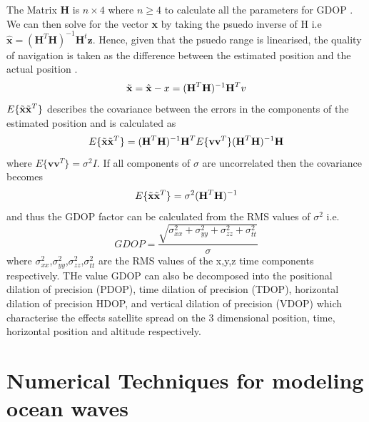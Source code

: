 The Matrix \textbf{H} is $n\times4$ where $n \geq 4$ to calculate all the parameters for GDOP \cite{jwo2001efficient}. We can then solve for the vector \textbf{x} by taking the psuedo inverse of H i.e $\hat{\textbf{x}} = (\textbf{H}^T\textbf{H})^{-1}\textbf{H}^t\textbf{z}$. Hence, given that the psuedo range is linearised, the quality of navigation is taken as the difference between the estimated position and the actual position \cite{jwo2001efficient}.
\begin{equation}
	\Tilde{\textbf{x}} = \hat{\textbf{x}} - x = (\textbf{H}^T\textbf{H})^{-1}\textbf{H}^Tv
\end{equation}
$E\{\Tilde{\textbf{x}}\Tilde{\textbf{x}}^T\}$ describes the covariance between the errors in the components of the estimated position \cite{jwo2001efficient} and is calculated as 
\begin{equation}
	E\{\Tilde{\textbf{x}}\Tilde{\textbf{x}}^T\} = (\textbf{H}^T\textbf{H})^{-1}\textbf{H}^TE\{\textbf{vv}^T\} (\textbf{H}^T\textbf{H})^{-1}\textbf{H}
\end{equation}
where $E\{\textbf{vv}^T\} = \sigma^2 I$. If all components of $\sigma$ are uncorrelated then the covariance becomes 
\begin{equation}
	E\{\Tilde{\textbf{x}}\Tilde{\textbf{x}}^T\} = \sigma^2(\textbf{H}^T\textbf{H})^{-1}
\end{equation}
and thus the GDOP factor can be calculated from the RMS values of $\sigma^2$ i.e.
\begin{equation}
	GDOP = \frac{\sqrt{\sigma_{xx}^2+\sigma_{yy}^2+ \sigma_{zz}^2+\sigma_{tt}^2}}{\sigma}
\end{equation} where $\sigma_{xx}^2$,$\sigma_{yy}^2$,$\sigma_{zz}^2$,$\sigma_{tt}^2$ are the RMS values of the x,y,z time components respectively. THe value GDOP can also be decomposed into the positional dilation of precision (PDOP), time dilation of precision (TDOP), horizontal dilation of precision HDOP, and vertical dilation of precision (VDOP) which characterise the effects satellite spread on the 3 dimensional position, time, horizontal position and altitude respectively.\par

\section{Numerical Techniques for modeling ocean waves}

